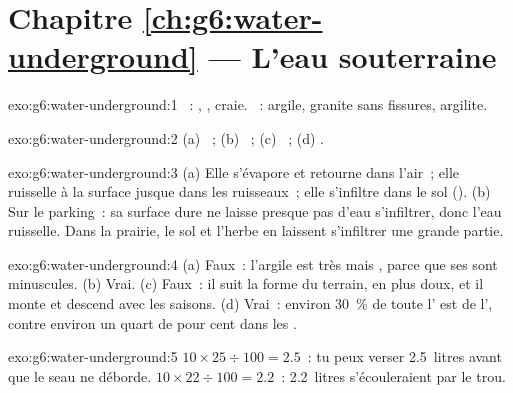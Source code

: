 \section*{Chapitre \ref{ch:g6:water-underground} --- L'eau souterraine}

\begin{solution}{exo:g6:water-underground:1}
~: , , craie. ~: argile, granite sans
fissures, argilite.
\end{solution}

\begin{solution}{exo:g6:water-underground:2}
(a) ~; (b) ~; (c) ~; (d) .
\end{solution}

\begin{solution}{exo:g6:water-underground:3}
(a) Elle s'évapore et retourne dans l'air~; elle ruisselle à la surface
jusque dans les ruisseaux~; elle s'infiltre dans le sol ().
(b) Sur le parking~: sa surface dure ne laisse presque pas d'eau
s'infiltrer, donc l'eau ruisselle. Dans la prairie, le sol et l'herbe en
laissent s'infiltrer une grande partie.
\end{solution}

\begin{solution}{exo:g6:water-underground:4}
(a) Faux~: l'argile est très  mais , parce que ses 
sont minuscules. (b) Vrai. (c) Faux~: il suit la forme du terrain, en plus
doux, et il monte et descend avec les saisons. (d) Vrai~: environ 30~\% de
toute l' est de l', contre environ un quart de
pour cent dans les .
\end{solution}

\begin{solution}{exo:g6:water-underground:5}
$10 \times 25 \div 100 = 2.5$~: tu peux verser 2.5~litres avant que le seau
ne déborde. $10 \times 22 \div 100 = 2.2$~: 2.2~litres s'écouleraient par
le trou.
\end{solution}

